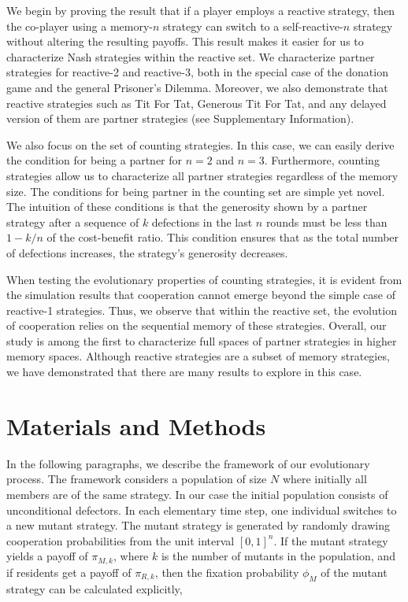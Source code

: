 \documentclass[11pt]{article}
\begin{document}
We begin by proving the result that if a player employs a reactive strategy,
then the co-player using a memory-$n$ strategy can switch to a self-reactive-$n$
strategy without altering the resulting payoffs. This result makes it easier for
us to characterize Nash strategies within the reactive set. We characterize
partner strategies for reactive-2 and reactive-3, both in the special case of
the donation game and the general Prisoner's Dilemma. Moreover, we also
demonstrate that reactive strategies such as Tit For Tat, Generous Tit For Tat,
and any delayed version of them are partner strategies (see Supplementary
Information).

We also focus on the set of counting strategies. In this case, we can easily
derive the condition for being a partner for $n=2$ and $n=3$. Furthermore,
counting strategies allow us to characterize all partner strategies regardless
of the memory size. The conditions for being partner in the counting set are
simple yet novel. The intuition of these conditions is that the generosity shown
by a partner strategy after a sequence of $k$ defections in the last $n$ rounds
must be less than $1 - k/n$ of the cost-benefit ratio. This condition ensures
that as the total number of defections increases, the strategy's generosity
decreases.

When testing the evolutionary properties of counting strategies, it is evident
from the simulation results that cooperation cannot emerge beyond the simple
case of reactive-1 strategies. Thus, we observe that within the reactive set,
the evolution of cooperation relies on the sequential memory of these strategies.
Overall, our study is among the first to characterize full spaces of partner
strategies in higher memory spaces. Although reactive strategies are a subset of
memory strategies, we have demonstrated that there are many results to explore
in this case.

\section*{Materials and Methods}\label{section:materials_and_methods}

In the following paragraphs, we describe the framework of our evolutionary
process. The framework considers a population of size \(N\) where initially all
members are of the same strategy. In our case the initial population consists of
unconditional defectors. In each elementary time step, one individual switches
to a new mutant strategy. The mutant strategy is generated by randomly drawing
cooperation probabilities from the unit interval \([0,1]^n\). If the mutant
strategy yields a payoff of \(\pi_{M, k}\), where \(k\) is the number of
mutants in the population, and if residents get a payoff of \(\pi_{R,
k}\), then the fixation probability \(\phi_{M}\) of the mutant strategy can be
calculated explicitly,
\end{document}
